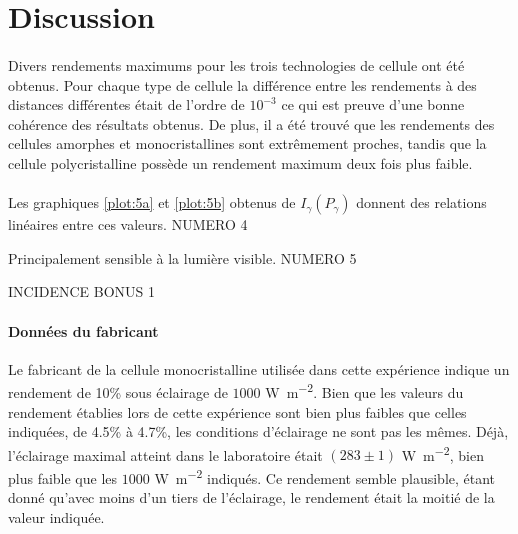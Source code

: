 \section{Discussion}



\paragraph{}
Divers rendements maximums pour les trois technologies de cellule ont été obtenus. Pour chaque type de cellule la différence entre les rendements à des distances différentes était de l'ordre de \(10^{-3}\) ce qui est preuve d'une bonne cohérence des résultats obtenus. De plus, il a été trouvé que les rendements des cellules amorphes et monocristallines sont extrêmement proches, tandis que la cellule polycristalline possède un rendement maximum deux fois plus faible.

\paragraph{}
Les graphiques \ref{plot:5a} et \ref{plot:5b} obtenus de \(I_\gamma (P_\gamma)\) donnent des relations linéaires entre ces valeurs. NUMERO 4




Principalement sensible à la lumière visible. NUMERO 5


INCIDENCE  BONUS 1


\paragraph{Données du fabricant}
Le fabricant de la cellule monocristalline utilisée dans cette expérience indique un rendement de 10\% sous éclairage de \(1000\) \unit{\watt \per \square \meter}. Bien que les valeurs du rendement établies lors de cette expérience sont bien plus faibles que celles indiquées, de 4.5\% à 4.7\%, les conditions d'éclairage ne sont pas les mêmes. Déjà, l'éclairage maximal atteint dans le laboratoire était \((283 \pm 1)\) \unit{\watt \per \square \meter}, bien plus faible que les \(1000\) \unit{\watt \per \square \meter} indiqués. Ce rendement semble plausible, étant donné qu'avec moins d'un tiers de l'éclairage, le rendement était la moitié de la valeur indiquée.
